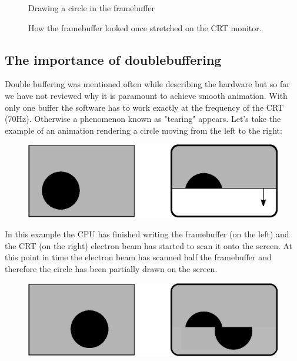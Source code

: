 \documentclass[book.tex]{subfiles}
\begin{document}
\begin{figure}[H]
  \centering
  \caption{Drawing a circle in the framebuffer}
\end{figure}

\begin{figure}[H]
  \centering
  \caption{How the framebuffer looked once stretched on the CRT monitor.}
\end{figure}
\par





\subsection{The importance of doublebuffering}
Double buffering was mentioned often while describing the hardware but so far we have not reviewed why it is paramount to achieve smooth animation. With only one buffer the software has to work exactly at the frequency of the CRT (70Hz). Otherwise a phenomenon known as "tearing" appears. Let's take the example of an animation rendering a circle moving from the left to the right:
\par
\begin{figure}[H]
\centering
\includegraphics[width=\textwidth]{imgs/drawings/doublebuffer_before.eps}
\end{figure}
\par
In this example the CPU has finished writing the framebuffer (on the left) and the CRT (on the right) electron beam has started to scan it onto the screen. At this point in time the electron beam has scanned half the framebuffer and therefore the circle has been partially drawn on the screen.
\par
\begin{figure}[H]
\centering
\includegraphics[width=\textwidth]{imgs/drawings/doublebuffer_after.eps}
\end{figure}
\end{document}
